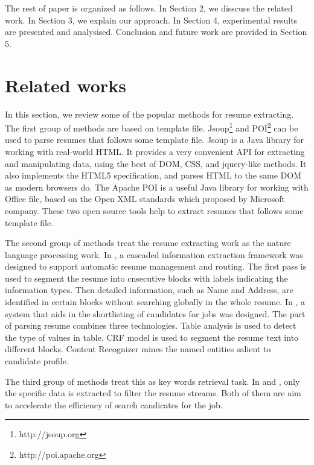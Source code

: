 \documentclass{acm_proc_article-sp}
\begin{document}

The rest of paper is organized as follows. In Section 2, we disscuss the related work. In Section 3, we explain our approach. In Section 4, experimental results are presented and analysised. Conclusion and future work are provided in Section 5.

\section{Related works}\label{sec:related-work}

In this section, we review some of the popular methods for resume extracting.
The first group of methods are based  on template file.
Jsoup\footnote{http://jsoup.org} and POI\footnote{http://poi.apache.org} can be used to parse resumes that follows some template file.
Jsoup is a Java library for working with real-world HTML. 
It provides a very convenient API for extracting and manipulating data, using the best of DOM, CSS, and jquery-like methods.
It also implements the HTML5 specification, and parses HTML to the same DOM as modern browsers do.
The Apache POI is a useful Java library for working with Office file, based on the Open XML standards which proposed by Microsoft company.
These two open source tools help to extract resumes that follows some template file.

The second group of methods treat the resume extracting work as the nature language processing work. 
In \cite{Yu:2005:RIE:1219840.1219902}, a cascaded information extraction framework was designed to support automatic resume management and routing.
The first pass is used to segment the resume into cnsecutive blocks with labels indicating the information types. 
Then detailed information, such as Name and Address, are identified in certain blocks without searching globally in the whole resume.
In \cite{Singh:2010:PSS:1871437.1871523}, a system that aids in the shortlisting of candidates for jobs was designed. 
The part of parsing resume combines three technologies. 
Table analysis is used to detect the type of values in table. 
CRF model is used to segment the resume text into different blocks. 
Content Recognizer mines the named entities salient to candidate profile.

The third group of methods treat this as key words retrieval task.
In \cite{kopparapu2010automatic} and \cite{maheshwari2010approach}, only the specific data is extracted to filter the resume streams. 
Both of them are aim to accelerate the efficiency of search candicates for the job.
\end{document}
